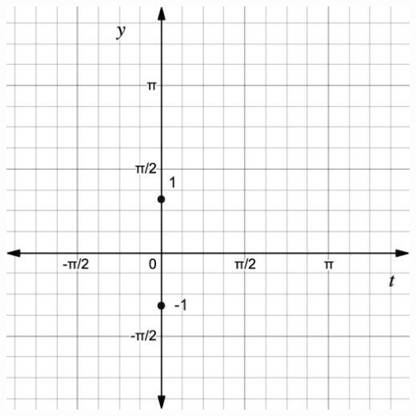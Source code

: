 \documentclass{ximera}
\begin{document}
\begin{problem}
\begin{image}
\includegraphics[width=1\linewidth]{SecArcsecAxis.pdf}
\end{image}
\end{problem}
\end{document}
